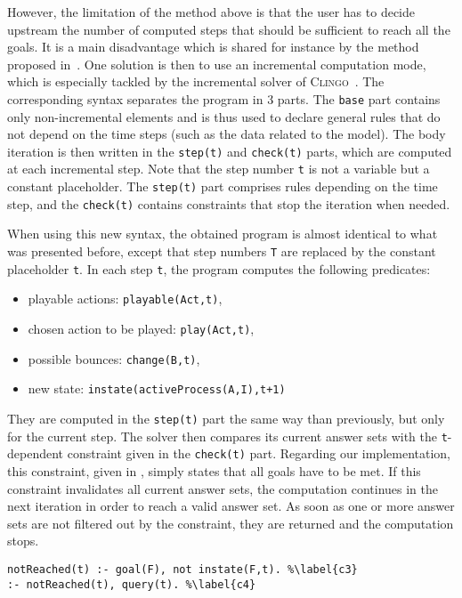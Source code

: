 However, the limitation of the method above is that the user has to decide upstream
the number of computed steps that should be sufficient to reach all the goals.
It is a main disadvantage which is shared for instance by the method proposed in~\cite{roccaasp}. %
One solution is then to use an incremental computation mode,
which is especially tackled by the incremental solver of \textsc{Clingo}~\cite{gebser2010incremental}.
The corresponding syntax separates the program in 3 parts.
The \texttt{base} part contains only non-incremental elements
and is thus used to declare general rules
that do not depend on the time steps (such as the data related to the model).
The body iteration is then written in the
\texttt{step(t)} and \texttt{check(t)} parts,
which are computed at each incremental step.
Note that the step number \texttt{t} is not a variable but a constant placeholder.
The \texttt{step(t)} part comprises rules depending on the time step,
and the \texttt{check(t)} contains constraints that stop the iteration when needed.

When using this new syntax, the obtained program is almost identical
to what was presented before,
except that step numbers \texttt{T}
are replaced by the constant placeholder \texttt{t}.
In each step \texttt{t}, the program computes the following predicates:
\begin{itemize}\renewcommand{\labelitemi}{--}
  \item playable actions: \texttt{playable(Act,t)},
  \item chosen action to be played: \texttt{play(Act,t)},
  \item possible bounces: \texttt{change(B,t)},
  \item new state: \texttt{instate(activeProcess(A,I),t+1)}
\end{itemize}
They are computed in the \texttt{step(t)} part
the same way than previously,
but only for the current step.
The solver then compares its current answer sets with
the \texttt{t}-dependent constraint given in the \texttt{check(t)} part.
Regarding our implementation, this constraint, given in ,
simply states that all goals have to be met.
If this constraint invalidates all current answer sets,
the computation continues in the next iteration in order to reach a valid answer set.
As soon as one or more answer sets are not filtered out by the constraint,
they are returned and the computation stops.
\begin{lstlisting}
notReached(t) :- goal(F), not instate(F,t). %\label{c3}
:- notReached(t), query(t). %\label{c4}
\end{lstlisting}


